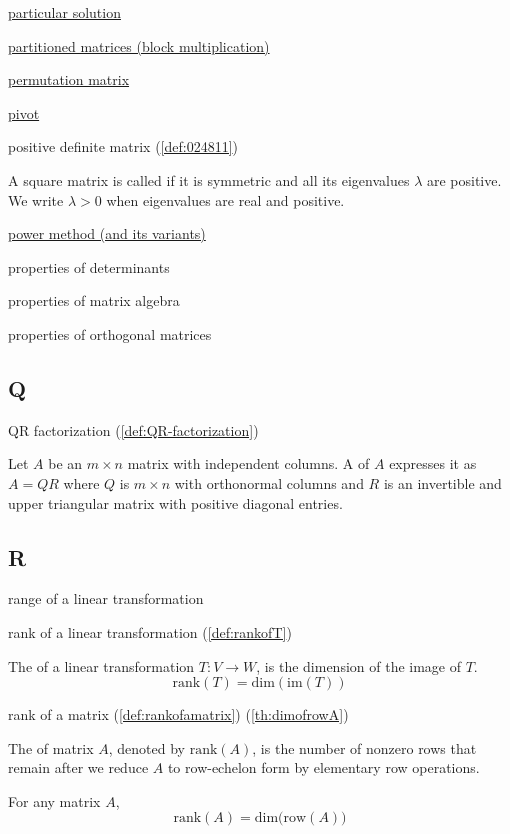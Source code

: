 \documentclass{ximera}
\begin{document}
\href{https://ximera.osu.edu/oerlinalg/LinearAlgebra/SYS-0050/main}{particular solution}

\href{https://ximera.osu.edu/oerlinalg/LinearAlgebra/MAT-0023/main}{partitioned matrices (block multiplication)}

\href{https://ximera.osu.edu/oerlinalg/LinearAlgebra/MAT-0070/main}{permutation matrix}

\href{https://ximera.osu.edu/oerlinalg/LinearAlgebra/SYS-0030/main}{pivot}

positive definite matrix (\ref{def:024811})
\begin{expandable}
    A square matrix is called  if it is symmetric and all its eigenvalues $\lambda$ are positive.  We write $\lambda>0$ when eigenvalues are real and positive.
\end{expandable}

\href{https://ximera.osu.edu/oerlinalg/LinearAlgebra/EIG-0070/main}{power method (and its variants)}

properties of determinants

properties of matrix algebra

properties of orthogonal matrices

\subsection{Q}

QR factorization (\ref{def:QR-factorization})
\begin{expandable}
    Let $A$ be an $m \times n$ matrix with independent columns. A  of $A$ expresses it as $A = QR$ where $Q$ is $m \times n$ with orthonormal columns and $R$ is an invertible and upper triangular matrix with positive diagonal entries.
\end{expandable}

\subsection{R}

range of a linear transformation

rank of a linear transformation (\ref{def:rankofT})
\begin{expandable}
    The  of a linear transformation $T:V\rightarrow W$, is the dimension of the image of $T$.
$$\mbox{rank}(T)=\mbox{dim}(\mbox{im}(T))$$
\end{expandable}

rank of a matrix (\ref{def:rankofamatrix}) (\ref{th:dimofrowA})
\begin{expandable}
    The  of matrix $A$, denoted by $\mbox{rank}(A)$, is the number of nonzero rows that remain after we reduce $A$ to row-echelon form by elementary row operations.

    For any matrix $A$,  
$$\mbox{rank}(A)=\mbox{dim}\Big(\mbox{row}(A)\Big)$$

\end{expandable}
\end{document}
